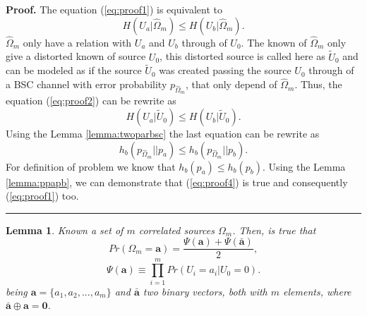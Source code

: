 \documentclass[a4paper,10pt]{article}
\newtheorem{mylemma}[mytheorem]{Lemma}
\newenvironment{myproof}[1][Proof]{\textbf{#1.} }{\ \rule{0.5em}{0.5em}}
\begin{document}
\begin{myproof}
\label{proof:minimo}
The equation (\ref{eq:proof1}) is equivalent to
\begin{equation}\label{eq:proof2}
 H( U_{a}| \hat{\Omega}_{m}) \leq H(U_b| \hat{\Omega}_{m} ).
\end{equation} 
$\hat{\Omega}_{m}$  only have a relation with $U_a$ and $U_b$ through of $U_0$. The
known of $\hat{\Omega}_{m}$ only give a distorted known of source $U_0$, this
distorted source is called here as $\tilde{U}_0$ and can be modeled as
 if the source $\tilde{U}_0$ was created passing the source $U_0$ through of
a BSC channel with error probability $p_{\hat{\Omega}_{m}}$, that only depend of 
$\hat{\Omega}_{m}$. Thus, the equation (\ref{eq:proof2}) can be rewrite as 
\begin{equation}\label{eq:proof3}
 H( U_{a}| \tilde{U}_0) \leq H(U_b| \tilde{U}_0 ).
\end{equation} 
Using the Lemma \ref{lemma:twoparbsc} the last equation can be rewrite as
\begin{equation}\label{eq:proof4}
h_{b}( p_{\hat{\Omega}_{m}}||p_{a} ) \leq h_{b}( p_{\hat{\Omega}_{m}}||p_{b} ).
\end{equation} 
For definition of problem we know that $h_{b}(p_a) \leq h_{b}(p_b)$. Using the 
Lemma \ref{lemma:ppapb}, we can demonstrate that (\ref{eq:proof4}) is true
and consequently (\ref{eq:proof1}) too. 
\end{myproof}
\begin{mdframed}[style=MDFStyGrayScreen]
\begin{mylemma}
 \label{lemm:PrA}
Known a set of $m$ correlated  sources  $\Omega_m$. Then, is true that
\begin{equation}\label{eq:PA}
Pr(\Omega_m=\mathbf{a})=\frac{ \Psi(\mathbf{a}) + \Psi(\mathbf{\bar{a}}) }{2},
\end{equation}
\begin{equation}\label{eq:PAequiv}
\Psi(\mathbf{a}) \equiv \prod \limits_{i=1}^{m}{Pr(U_i=a_i|U_0=0)}.
\end{equation}
being $\mathbf{a}=\{a_1, a_2, ..., a_m\}$ and $\mathbf{\bar{a}}$ two 
binary vectors, both with $m$ elements, where $\mathbf{\bar{a}}\oplus \mathbf{a}=\mathbf{0}$. 
\end{mylemma}
\end{mdframed}
\end{document}
